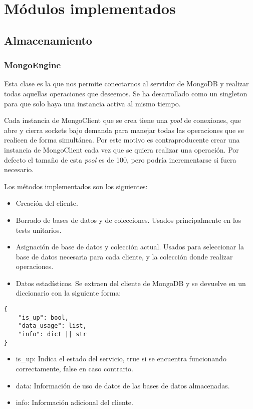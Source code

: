 \chapter{Módulos implementados}



\section{Almacenamiento}

\subsection{MongoEngine}

Esta clase es la que nos permite conectarnos al servidor de MongoDB y realizar todas aquellas operaciones que deseemos. Se ha desarrollado como un singleton para que solo haya una instancia activa al mismo tiempo.

\bigskip
Cada instancia de MongoClient que se crea tiene una \textit{pool} de conexiones, que abre y cierra sockets bajo demanda para manejar todas las operaciones que se realicen de forma simultánea. Por este motivo es contraproducente crear una instancia de MongoClient cada vez que se quiera realizar una operación. Por defecto el tamaño de esta \textit{pool} es de 100, pero podría incrementarse si fuera necesario.

\bigskip
Los métodos implementados son los siguientes:
\begin{itemize}
	\item Creación del cliente.
	\item Borrado de bases de datos y de colecciones. Usados principalmente en los tests unitarios.
	\item Asignación de base de datos y colección actual. Usados para seleccionar la base de datos necesaria para cada cliente, y la colección donde realizar operaciones.
	\item Datos estadísticos. Se extraen del cliente de MongoDB y se devuelve en un diccionario con la siguiente forma:
\end{itemize}
	
\begin{lstlisting}
{
	"is_up": bool,
	"data_usage": list,
	"info": dict || str
}
\end{lstlisting}

\begin{itemize}
	\item is\_up: Indica el estado del servicio, true si se encuentra funcionando correctamente, false en caso contrario.
	\item data: Información de uso de datos de las bases de datos almacenadas.
	\item info: Información adicional del cliente.
\end{itemize}



